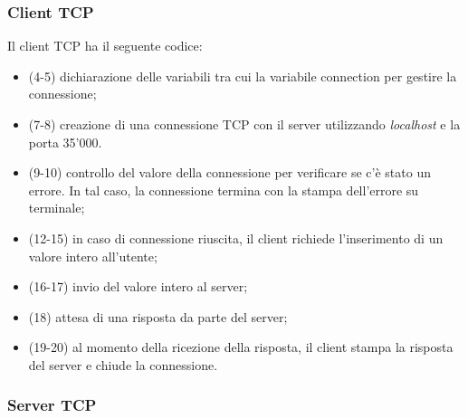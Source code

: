 \documentclass[a4paper]{article}
\begin{document}
	\subsubsection{Client TCP}\label{client TCP}
	
	Il client TCP ha il seguente codice:
	
	\begin{itemize}
		\item (4-5) dichiarazione delle variabili tra cui la variabile \textsf{connection} per gestire la connessione;
		
		\item (7-8) creazione di una connessione TCP con il server utilizzando \emph{localhost} e la porta 35'000. 
		
		\item (9-10) controllo del valore della connessione per verificare se c'è stato un errore. In tal caso, la connessione termina con la stampa dell'errore su terminale;
		
		\item (12-15) in caso di connessione riuscita, il client richiede l'inserimento di un valore intero all'utente;
		
		\item (16-17) invio del valore intero al server;
		
		\item (18) attesa di una risposta da parte del server;
		
		\item (19-20) al momento della ricezione della risposta, il client stampa la risposta del server e chiude la connessione.
	\end{itemize}\newpage
	
	\subsubsection{Server TCP}\label{server TCP}
	
\end{document}
